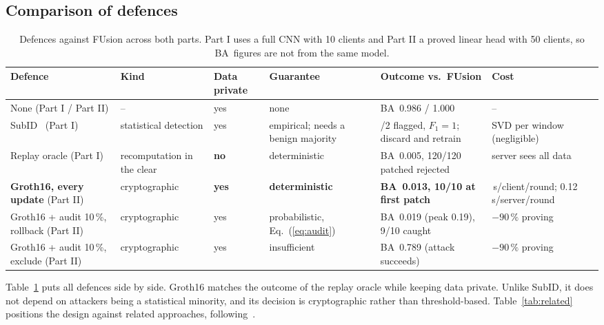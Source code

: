 \documentclass[conference]{IEEEtran}
\newcommand{\BA}{\textrm{BA}}
\begin{document}
\subsection{Comparison of defences}
\begin{table}[t]
\centering\footnotesize\caption{Defences against FUsion across both parts. Part I uses a full CNN with 10
clients and Part II a proved linear head with 50 clients, so \BA\ figures are not from the same
model.}\label{tab:compare}
\setlength{\tabcolsep}{4pt}
\begin{tabular}{@{}>{\raggedright\arraybackslash}p{3.5cm}>{\raggedright\arraybackslash}p{2.4cm}>{\raggedright\arraybackslash}p{1.1cm}>{\raggedright\arraybackslash}p{2.6cm}>{\raggedright\arraybackslash}p{3.5cm}>{\raggedright\arraybackslash}p{3.3cm}@{}}
\toprule
Defence & Kind & Data private & Guarantee & Outcome vs.\ FUsion & Cost\\\midrule
None (Part I / Part II) & -- & yes & none & \BA\ 0.986 / 1.000 & --\\
SubID~\cite{fusion} (Part I) & statistical detection & yes & empirical; needs a benign majority & 2/2 flagged, $F_1=1$; discard and retrain & SVD per window (negligible)\\
Replay oracle (Part I) & recomputation in the clear & \textbf{no} & deterministic & \BA\ 0.005, 120/120 patched rejected & server sees all data\\
\textbf{Groth16, every update} (Part II) & cryptographic & \textbf{yes} & \textbf{deterministic} & \textbf{\BA\ 0.013, 10/10 at first patch} & 1.44\,s/client/round; 0.12\,s/server/round\\
Groth16 + audit 10\,\%, rollback (Part II) & cryptographic & yes & probabilistic, Eq.~(\ref{eq:audit}) & \BA\ 0.019 (peak 0.19), 9/10 caught & $-90\,\%$ proving\\
Groth16 + audit 10\,\%, exclude (Part II) & cryptographic & yes & insufficient & \BA\ 0.789 (attack succeeds) & $-90\,\%$ proving\\\bottomrule
\end{tabular}
\end{table}

Table~\ref{tab:compare} puts all defences side by side. Groth16 matches the outcome of the replay
oracle while keeping data private. Unlike SubID, it does not depend on attackers being a
statistical minority, and its decision is cryptographic rather than threshold-based.
Table~\ref{tab:related} positions the design against related approaches, following~\cite{zkdesign}.
\end{document}
